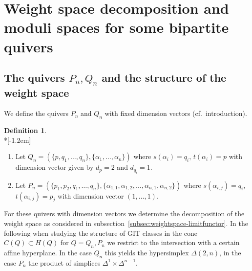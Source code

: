 \documentclass[10pt,a4paper]{amsart}
\newcommand{\cf}{cf.\ }
\theoremstyle{definition}
\newtheorem{defi}[theo]{Definition}
\begin{document}
\section{Weight space decomposition and moduli spaces for some bipartite quivers}
\label{sec:weightspace-moduli-PnQn}

\subsection{The quivers \texorpdfstring{$P_n,Q_n$}{Pn,Qn} and the structure of the weight space}
\label{subsec:weightspacePnQn}

We define the quivers $P_n$ and $Q_n$ with fixed dimension vectors (\cf introduction).

\begin{defi}\ \\*[-1.2em]
\begin{enumerate}[label=(\alph*)]
\item\label{defi2.1_a} %
Let
$Q_n=(\{p,q_1,\ldots,q_n\},\{\alpha_1,\ldots,\alpha_n\})$
where $s(\alpha_i)=q_i$, $t(\alpha_i)=p$ with dimension vector given by $d_p=2$ 
and $d_{q_i}=1$. %

\item\label{defi2.1_b} %
Let $P_n=(\{p_1,p_2,q_1,\ldots,q_n\},\{\alpha_{1,1},\alpha_{1,2},\ldots,
\alpha_{n,1},\alpha_{n,2}\})$
where $s(\alpha_{i,j})=q_i$, $t(\alpha_{i,j})=p_j$ with dimension 
vector $(1,\ldots,1)$.
\end{enumerate}
\end{defi}

For these quivers with dimension vectors we determine the decomposition of the 
weight space as considered in subsection~\ref{subsec:weightspace-limitfunctor}. 
In the following when studying the structure of GIT classes in the cone 
$C(Q)\subset H(Q)$ for $Q=Q_n,P_n$ we restrict to the intersection with 
a certain affine hyperplane. In the case $Q_n$ this yields the hypersimplex 
$\Delta(2,n)$, in the case $P_n$ the product of simplices $\Delta^1\times\Delta^{n-1}$.
\end{document}
